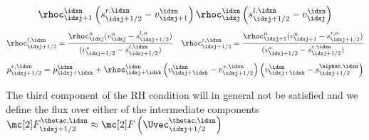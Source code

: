 \begin{defnbox}
\begin{defn}
{\begin{align*}
{                                   }{
                                   \rhoc_{\idxj+1}^{\idxn}\left(s_{\idxj+1/2}^{r,\idxn}-v_{\idxj+1}^{\idxn} \right)
                                   \rhoc_{\idxj}^{\idxn}\left(s_{\idxj+1/2}^{l,\idxn}-v_{\idxj}^{\idxn} \right)
                                   }
        \end{align*}}
             \begin{alignat*}{2}
          \rhoc_{\idxj+1/2}^{l,\idxn}=\frac{\rhoc_{\idxj}^{n}(v_{\idxj}^{n}-s_{\idxj+1/2}^{l,n})}{(v_{\idxj+1/2}^{*}-s_{\idxj+1/2}^{l,\idxn})}
                      &&\rhoc_{\idxj+1/2}^{r,\idxn}=\frac{\rhoc_{\idxj+1}^{n}(v_{\idxj+1}^{n}-s_{\idxj+1/2}^{r,n})}{(v_{\idxj+1/2}^{*}-s_{\idxj+1/2}^{r,\idxn})}
        \end{alignat*}
        \begin{align*}
          p_{\idxj+1/2}^{*,\idxn}=p_{\idxj+\idxk}^{\idxn}+\rhoc_{\idxj+\idxk}^{\idxn}\left(v_{\idxj+\idxk}^{\idxn}-v_{\idxj+1/2}^{*,\idxn}\right)
          \left(v_{\idxj+\idxk}^{\idxn}-s_{\idxj+1/2}^{\alphac,\idxn}\right)
        \end{align*}
    \end{defn}
\end{defnbox}
\begin{notebox}[Note]\nospacing
    The third component of the RH condition will in general not be satisfied and we define the flux over either of the intermediate components
    $\Flux_{\idxj+1/2}^{\thetac,\idxn}\approx\Flux\left(\Uvec_{\idxj+1/2}^{\thetac,\idxn}\right)$
\end{notebox}
